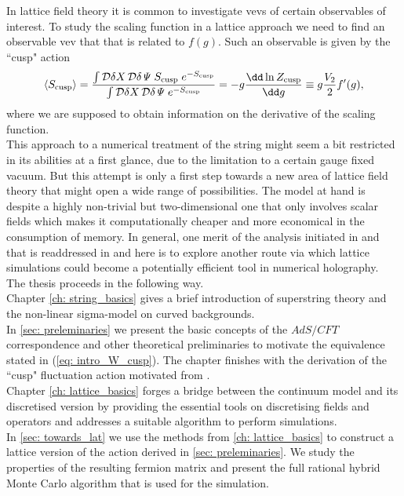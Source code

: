 %
%
In lattice field theory it is common to investigate vevs of certain observables of interest. To study the scaling function in a lattice approach we need to find an observable vev that that is related to $f(g)$. Such an observable is given by the ``cusp" action
%
%
\begin{equation}
\langle S_{\rm cusp} \rangle = \frac{\int \mathcal{D}\delta X\,\mathcal{D}\delta\mathit{\Psi} \; S_{\rm cusp} \;e^{-S_{\rm cusp}}}{\int \mathcal{D}\delta X\,\mathcal{D}\delta\mathit{\Psi} \; e^{-S_{\rm cusp}}} = -g \frac{\dd \ln Z_{\rm cusp}}{\dd g} \equiv g\frac{V_{2}}{2} f'(g),
\end{equation}
%
%
where we are supposed to obtain information on the derivative of the scaling function.\\
This approach to a numerical treatment of the  string might seem a bit restricted in its abilities at a first glance, due to the limitation to a certain gauge fixed vacuum. But this attempt is only a first step towards a new area of lattice field theory that might open a wide range of possibilities. The model at hand is despite a highly non-trivial but two-dimensional one that only involves scalar fields which makes it computationally cheaper and more economical in the consumption of memory. In general, one merit of the analysis initiated in \cite{Roiban} and that is readdressed in \cite{Bianchi:2016cyv,Forini:2016sot} and here is to explore another route via which lattice simulations could become a potentially efficient tool in numerical holography.\\[0.5cm]
%
%
The thesis proceeds in the following way.\\
%
Chapter \ref{ch: string_basics} gives a brief introduction of superstring theory and the non-linear sigma-model on curved backgrounds.\\
%
In \autoref{sec: preleminaries} we present the basic concepts of the $AdS/CFT$ correspondence and other theoretical preliminaries to motivate the equivalence stated in (\ref{eq: intro_W_cusp}). The chapter finishes with the derivation of the ``cusp" fluctuation action motivated from \cite{Metsaev:2000yu,Metsaev:2000yf,Giombi:2009gd}.\\
%
Chapter \ref{ch: lattice_basics} forges a bridge between the continuum model and its discretised version by providing the essential tools on discretising fields and operators and addresses a suitable algorithm to perform simulations.\\
%
In \autoref{sec: towards_lat} we use the methods from \autoref{ch: lattice_basics} to construct a lattice version of the action derived in \autoref{sec: preleminaries}. We study the properties of the resulting fermion matrix and present the full rational hybrid Monte Carlo algorithm that is used for the simulation.\\
